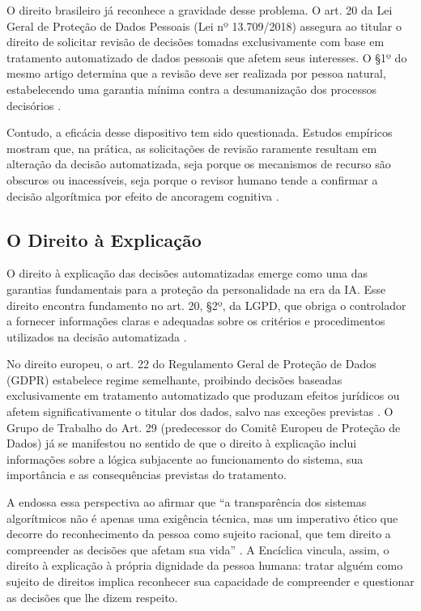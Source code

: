 O direito brasileiro já reconhece a gravidade desse problema. O art. 20 da Lei Geral de Proteção de Dados Pessoais (Lei nº 13.709/2018) assegura ao titular o direito de solicitar revisão de decisões tomadas exclusivamente com base em tratamento automatizado de dados pessoais que afetem seus interesses. O §1º do mesmo artigo determina que a revisão deve ser realizada por pessoa natural, estabelecendo uma garantia mínima contra a desumanização dos processos decisórios \cite{Brasil2018LGPD}.

Contudo, a eficácia desse dispositivo tem sido questionada. Estudos empíricos mostram que, na prática, as solicitações de revisão raramente resultam em alteração da decisão automatizada, seja porque os mecanismos de recurso são obscuros ou inacessíveis, seja porque o revisor humano tende a confirmar a decisão algorítmica por efeito de ancoragem cognitiva \cite{Binns2018ITG, Edwards2017PC}.

\subsection{O Direito à Explicação}
\label{subsec:direito-explicacao}

O direito à explicação das decisões automatizadas emerge como uma das garantias fundamentais para a proteção da personalidade na era da IA. Esse direito encontra fundamento no art. 20, §2º, da LGPD, que obriga o controlador a fornecer informações claras e adequadas sobre os critérios e procedimentos utilizados na decisão automatizada \cite{Brasil2018LGPD}.

No direito europeu, o art. 22 do Regulamento Geral de Proteção de Dados (GDPR) estabelece regime semelhante, proibindo decisões baseadas exclusivamente em tratamento automatizado que produzam efeitos jurídicos ou afetem significativamente o titular dos dados, salvo nas exceções previstas \cite{UE2016GDPR}. O Grupo de Trabalho do Art. 29 (predecessor do Comitê Europeu de Proteção de Dados) já se manifestou no sentido de que o direito à explicação inclui informações sobre a lógica subjacente ao funcionamento do sistema, sua importância e as consequências previstas do tratamento.

A \MH{} endossa essa perspectiva ao afirmar que ``a transparência dos sistemas algorítmicos não é apenas uma exigência técnica, mas um imperativo ético que decorre do reconhecimento da pessoa como sujeito racional, que tem direito a compreender as decisões que afetam sua vida'' \cite{LeaoXIV2026MH}. A Encíclica vincula, assim, o direito à explicação à própria dignidade da pessoa humana: tratar alguém como sujeito de direitos implica reconhecer sua capacidade de compreender e questionar as decisões que lhe dizem respeito.

